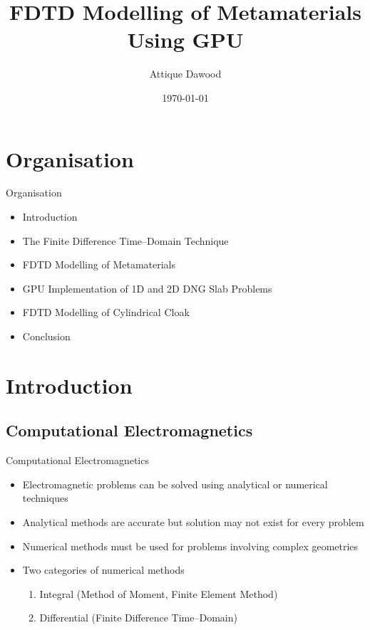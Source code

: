 \documentclass{beamer}
\title{FDTD Modelling of Metamaterials Using GPU}
\author{Attique Dawood}
\institute{FAST, Islamabad}
\date{\today}
\begin{document}
\begin{frame}
\titlepage
\end{frame}


\section{Organisation}
\begin{frame}{Organisation}
	\begin{itemize}
	\item Introduction
	\item The Finite Difference Time--Domain Technique
	\item FDTD Modelling of Metamaterials
	\item GPU Implementation of 1D and 2D DNG Slab Problems
	\item FDTD Modelling of Cylindrical Cloak
	\item Conclusion
	\end{itemize}
\end{frame}

\section{Introduction}
\subsection{Computational Electromagnetics}
\begin{frame}{Computational Electromagnetics}
	\begin{itemize}
	\item Electromagnetic problems can be solved using analytical or numerical techniques
	\item Analytical methods are accurate but solution may not exist for every problem
	\item Numerical methods must be used for problems involving complex geometries
	\item Two categories of numerical methods
	\begin{enumerate}
		\item Integral (Method of Moment, Finite Element Method)
		\item Differential (Finite Difference Time--Domain)
	\end{enumerate}
	\end{itemize}
\end{frame}
\end{document}
